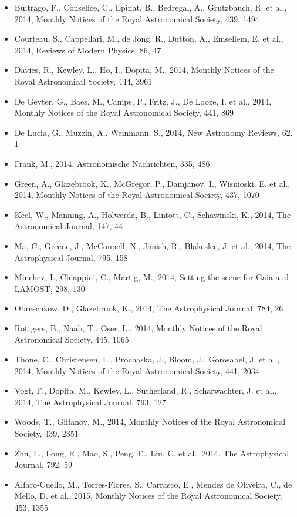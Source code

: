 \documentclass{letter}
\begin{document}
\begin{enumerate}
\begin{itemize}
\item Buitrago, F., Conselice, C., Epinat, B., Bedregal, A., Grutzbauch, R. et al., 2014, Monthly Notices of the Royal Astronomical Society, 439, 1494
\item Courteau, S., Cappellari, M., de Jong, R., Dutton, A., Emsellem, E. et al., 2014, Reviews of Modern Physics, 86, 47
\item Davies, R., Kewley, L., Ho, I., Dopita, M., 2014, Monthly Notices of the Royal Astronomical Society, 444, 3961
\item De Geyter, G., Baes, M., Camps, P., Fritz, J., De Looze, I. et al., 2014, Monthly Notices of the Royal Astronomical Society, 441, 869
\item De Lucia, G., Muzzin, A., Weinmann, S., 2014, New Astronomy Reviews, 62, 1
\item Frank, M., 2014, Astronomische Nachrichten, 335, 486
\item Green, A., Glazebrook, K., McGregor, P., Damjanov, I., Wisnioski, E. et al., 2014, Monthly Notices of the Royal Astronomical Society, 437, 1070
\item Keel, W., Manning, A., Holwerda, B., Lintott, C., Schawinski, K., 2014, The Astronomical Journal, 147, 44
\item Ma, C., Greene, J., McConnell, N., Janish, R., Blakeslee, J. et al., 2014, The Astrophysical Journal, 795, 158
\item Minchev, I., Chiappini, C., Martig, M., 2014, Setting the scene for Gaia and LAMOST, 298, 130
\item Obreschkow, D., Glazebrook, K., 2014, The Astrophysical Journal, 784, 26
\item Rottgers, B., Naab, T., Oser, L., 2014, Monthly Notices of the Royal Astronomical Society, 445, 1065
\item Thone, C., Christensen, L., Prochaska, J., Bloom, J., Gorosabel, J. et al., 2014, Monthly Notices of the Royal Astronomical Society, 441, 2034
\item Vogt, F., Dopita, M., Kewley, L., Sutherland, R., Scharwachter, J. et al., 2014, The Astrophysical Journal, 793, 127
\item Woods, T., Gilfanov, M., 2014, Monthly Notices of the Royal Astronomical Society, 439, 2351
\item Zhu, L., Long, R., Mao, S., Peng, E., Liu, C. et al., 2014, The Astrophysical Journal, 792, 59
\item Alfaro-Cuello, M., Torres-Flores, S., Carrasco, E., Mendes de Oliveira, C., de Mello, D. et al., 2015, Monthly Notices of the Royal Astronomical Society, 453, 1355

\end{itemize}
\end{enumerate}
\end{document}
